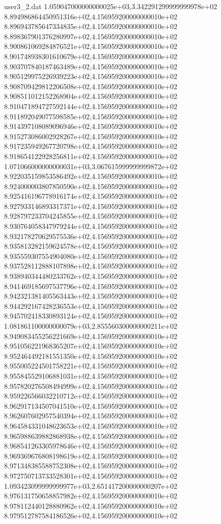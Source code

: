\begin{filecontents}{user3_2.dat}
1.059047000000000025e+03,3.342291299999999978e+02
8.894986864450951316e+02,4.156959200000000010e+02
8.896943785647334835e+02,4.156959200000000010e+02
8.898367901376280997e+02,4.156959200000000010e+02
8.900861069284876521e+02,4.156959200000000010e+02
8.901748938301610679e+02,4.156959200000000010e+02
8.903707840187463489e+02,4.156959200000000010e+02
8.905129975226939223e+02,4.156959200000000010e+02
8.908709429812206508e+02,4.156959200000000010e+02
8.908511012152268904e+02,4.156959200000000010e+02
8.910471894727592144e+02,4.156959200000000010e+02
8.911892049077598585e+02,4.156959200000000010e+02
8.914397108089096946e+02,4.156959200000000010e+02
8.915273086002928267e+02,4.156959200000000010e+02
8.917235949267720798e+02,4.156959200000000010e+02
8.918654122928256811e+02,4.156959200000000010e+02
1.071066000000000031e+03,3.067615999999999872e+02
8.922035159853586492e+02,4.156959200000000010e+02
8.924000003807850590e+02,4.156959200000000010e+02
8.925416196778916174e+02,4.156959200000000010e+02
8.927933146893317371e+02,4.156959200000000010e+02
8.928797233704245855e+02,4.156959200000000010e+02
8.930764058347979244e+02,4.156959200000000010e+02
8.932178270629575536e+02,4.156959200000000010e+02
8.935813282159624578e+02,4.156959200000000010e+02
8.935559307554904080e+02,4.156959200000000010e+02
8.937528112888107898e+02,4.156959200000000010e+02
8.938940344480233762e+02,4.156959200000000010e+02
8.941469185697537796e+02,4.156959200000000010e+02
8.942321381405563443e+02,4.156959200000000010e+02
8.944292167428236553e+02,4.156959200000000010e+02
8.945702418330893124e+02,4.156959200000000010e+02
1.081861100000000079e+03,2.855560300000000211e+02
8.949083455256221669e+02,4.156959200000000010e+02
8.951056221968365207e+02,4.156959200000000010e+02
8.952464492181551350e+02,4.156959200000000010e+02
8.955005224501758221e+02,4.156959200000000010e+02
8.955845529106881031e+02,4.156959200000000010e+02
8.957820276508494999e+02,4.156959200000000010e+02
8.959226566032210712e+02,4.156959200000000010e+02
8.962917134507041510e+02,4.156959200000000010e+02
8.962607602957540394e+02,4.156959200000000010e+02
8.964584331048623653e+02,4.156959200000000010e+02
8.965988639882868938e+02,4.156959200000000010e+02
8.968541263305978646e+02,4.156959200000000010e+02
8.969369676808198619e+02,4.156959200000000010e+02
8.971348385588752308e+02,4.156959200000000010e+02
8.972750713733528301e+02,4.156959200000000010e+02
1.093423099999999977e+03,2.651417200000000207e+02
8.976131750658857982e+02,4.156959200000000010e+02
8.978112440128880962e+02,4.156959200000000010e+02
8.979512787584186526e+02,4.156959200000000010e+02

\end{filecontents}
